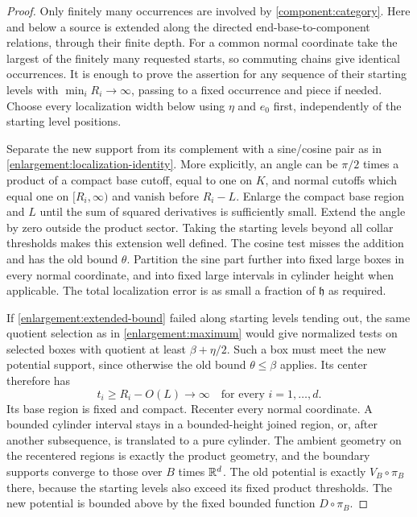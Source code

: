 \begin{proof}
Only finitely many occurrences are involved by \cref{component:category}.
Here and below a source is extended along the directed end-base-to-component
relations, through their finite depth.
For a common normal coordinate take the largest of the finitely many
requested starts, so commuting chains give identical occurrences.
It is enough to prove the assertion for any sequence of their starting levels
with $\min_iR_i\to\infty$, passing to a fixed occurrence and piece if
needed.  Choose every localization width below using $\eta$ and $e_0$
first, independently of the starting level positions.

Separate the new support from its complement with a sine/cosine pair
as in \cref{enlargement:localization-identity}.  More explicitly, an angle can be $\pi/2$
times a product of a compact base cutoff, equal to one on $K$, and
normal cutoffs which equal one on $[R_i,\infty)$ and vanish before
$R_i-L$.  Enlarge the compact base region and $L$ until the sum of
squared derivatives is sufficiently small.  Extend the angle by zero
outside the product sector.  Taking the starting levels beyond all collar
thresholds makes this extension well defined.  The cosine test misses
the addition and has the old bound $\theta$.  Partition the sine part
further into fixed large boxes in every normal coordinate, and into
fixed large intervals in cylinder height when applicable.  The total
localization error is as small a fraction of $\mathfrak h$ as required.

If \cref{enlargement:extended-bound} failed along starting levels tending out, the
same quotient selection as in \cref{enlargement:maximum} would give
normalized tests on selected boxes with quotient at least
$\beta+\eta/2$.  Such a box must meet the new potential support,
since otherwise the old bound $\theta\le\beta$ applies.  Its center
therefore has
\[
 t_i\ge R_i-O(L)\longrightarrow\infty
 \quad\text{for every }i=1,\ldots,d.
\]
Its base region is fixed and compact.  Recenter every normal coordinate.
A bounded cylinder interval stays in a bounded-height joined region,
or, after another subsequence, is translated to a pure cylinder.  The
ambient geometry on the recentered regions is exactly the product
geometry, and the boundary supports converge to those over $B$ times $\mathbb R^d$.
The old potential is exactly $V_B\circ\pi_B$ there, because the starting levels
also exceed its fixed product thresholds.  The new potential is bounded
above by the fixed bounded function $D\circ\pi_B$.


\end{proof}
